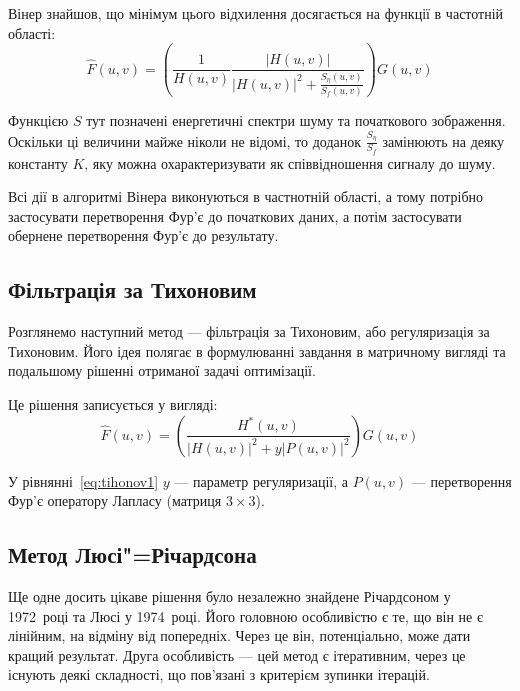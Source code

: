 \documentclass{diploma}
\begin{document}
      Вінер знайшов, що мінімум цього відхилення досягається на функції в
      частотній області:
      \begin{equation}
        \hat{F}\left( u, v \right) = \left( \frac{1}{H\left( u, v \right)}
        \frac{\left| H\left( u, v \right)\right|}{\left|H\left( u, v
          \right)\right|^2 + \frac{S_\eta\left( u, v \right)}{S_f\left( u, v
          \right)}} \right) G\left( u, v \right)
        \label{eq:wiener1}
      \end{equation}

      Функцією $S$ тут позначені енергетичні спектри шуму та початкового
      зображення.
      Оскільки ці величини майже ніколи не відомі, то доданок
      $\frac{S_\eta}{S_f}$ замінюють на деяку константу $K$, яку можна
      охарактеризувати як співвідношення сигналу до шуму.

      Всі дії в алгоритмі Вінера виконуються в частнотній області, а тому
      потрібно застосувати перетворення Фур’є до початкових даних, а потім
      застосувати обернене перетворення Фур’є до результату.
      \clearpage
    \subsection{Фільтрація за Тихоновим}
      Розглянемо наступний метод --- фільтрація за Тихоновим, або
      регуляризація за Тихоновим.
      Його ідея полягає в формулюванні завдання в матричному вигляді та
      подальшому рішенні отриманої задачі оптимізації.

      Це рішення записується у вигляді:
      \begin{equation}
        \hat{F}\left( u, v \right) = \left( \frac{H^\ast\left( u, v
        \right)}{\left|H\left( u, v \right)\right|^2 + y\left|P\left( u, v
        \right)\right|^2} \right) G\left( u, v \right)
        \label{eq:tihonov1}
      \end{equation}

      У рівнянні~\eqref{eq:tihonov1} $y$ --- параметр регуляризації, а
      $P\left( u, v \right)$ --- перетворення Фур’є оператору Лапласу (матриця
      $3\times3$).
    \subsection{Метод Люсі"=Річардсона}
      Ще одне досить цікаве рішення було незалежно знайдене Річардсоном у
      1972~році та Люсі у 1974~році.
      Його головною особливістю є те, що він не є лінійним, на відміну від
      попередніх.
      Через це він, потенціально, може дати кращий результат.
      Друга особливість --- цей метод є ітеративним, через це існують деякі
      складності, що пов’язані з критерієм зупинки ітерацій.
\end{document}
